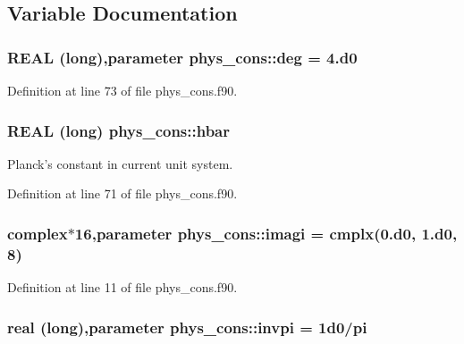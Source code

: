 \subsection{Variable Documentation}
\hypertarget{namespacephys__cons_a553e3e17652770308e6bffcb8fcb5a95}{
\subsubsection[{deg}]{\setlength{\rightskip}{0pt plus 5cm}REAL (long),parameter {\bf phys\_\-cons::deg} = 4.d0}}
\label{namespacephys__cons_a553e3e17652770308e6bffcb8fcb5a95}


Definition at line 73 of file phys\_\-cons.f90.

\hypertarget{namespacephys__cons_a10c52cbe8a9d32eb836e12b67ef7da3b}{
\subsubsection[{hbar}]{\setlength{\rightskip}{0pt plus 5cm}REAL (long) {\bf phys\_\-cons::hbar}}}
\label{namespacephys__cons_a10c52cbe8a9d32eb836e12b67ef7da3b}


Planck's constant in current unit system. 



Definition at line 71 of file phys\_\-cons.f90.

\hypertarget{namespacephys__cons_a0dbb22856790b16e206de451e9cdd74a}{
\subsubsection[{imagi}]{\setlength{\rightskip}{0pt plus 5cm}complex$\ast$16,parameter {\bf phys\_\-cons::imagi} = cmplx(0.d0, 1.d0, 8)}}
\label{namespacephys__cons_a0dbb22856790b16e206de451e9cdd74a}


Definition at line 11 of file phys\_\-cons.f90.

\hypertarget{namespacephys__cons_aa8683f00f4216acc1822dfcb85b1ee00}{
\subsubsection[{invpi}]{\setlength{\rightskip}{0pt plus 5cm}real (long),parameter {\bf phys\_\-cons::invpi} = 1d0/pi}}
\label{namespacephys__cons_aa8683f00f4216acc1822dfcb85b1ee00}


